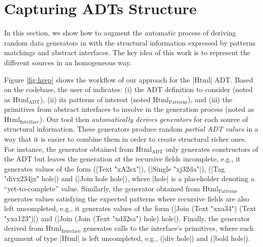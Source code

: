 \section{Capturing ADTs Structure} \label{sec:hrepcont}

\begin{figure*}[t]
  \centering
  
  \caption{Deriving a generator for the ADT |Html| with the structural
    information found in module |M|.}
  \vspace{-5pt}
  \label{fig:hrep}
  \vspace{-5pt}
\end{figure*}

In this section, we show how to augment the automatic process of deriving random
data generators in {\dragen} with the structural information expressed by
patterns matchings and abstract interfaces.
%
The key idea of this work is to represent the different sources in an
homogeneous way.
%
%

Figure \ref{fig:hrep} shows the workflow of our approach for the |Html| ADT.
%
Based on the codebase, the user of \dragenp indicates: (i) the ADT definition to
consider (noted as $\mathrm{Html_{ADT}}$), (ii) its patterns of interest (noted
$\mathrm{Html_{Patterns}}$), and (iii) the primitives from abstract interfaces
to involve in the generation process (noted as $\mathrm{Html_{Interface}}$).
%
%
Our tool then \emph{automatically derives generators} for each source of
structural information.
%
These generators produce random \emph{partial ADT values} in a way that it is
easier to combine them in order to create structural richer ones.
%
For instance, the generator obtained from $\mathrm{Html_{ADT}}$ only generates
constructors of the ADT but leaves the generation at the recursive fields
incomplete, e.g., it generates values of the form (|Text "xA2sx"|), (|Single
"xj32da"|), (|Tag "divx234jx" hole|) and (|Join hole hole|), where |hole| is a
placeholder denoting a ``yet-to-complete'' value.
%
%
%
Similarly, the generator obtained from $\mathrm{Html_{Patterns}}$ generates values
satisfying the expected patterns where recursive fields are also left
uncompleted, e.g., it generates values of the form (|Join (Text "xxa34") (Text
"yxa123")|) and (|Join (Join (Text "xd32sa") hole) hole|).
%
Finally, the generator derived from $\mathrm{Html_{Interface}}$ generates calls to the
interface's primitives, where each argument of type |Html| is left uncompleted,
e.g., (|div hole|) and (|bold hole|).
%

